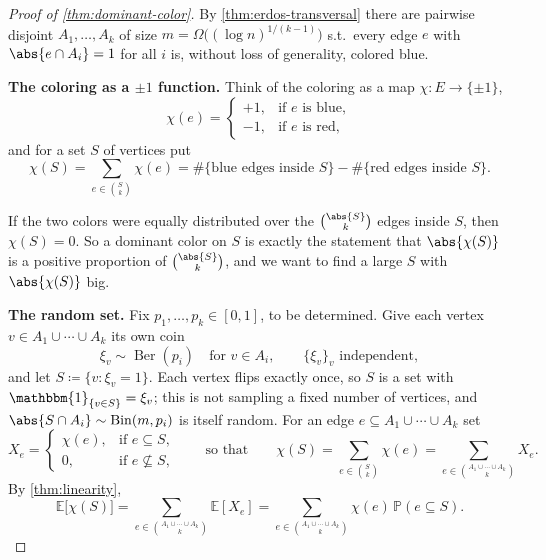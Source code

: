 \begin{proof}[Proof of \autoref{thm:dominant-color}]
    By \autoref{thm:erdos-transversal} there are pairwise disjoint \(A_1, \ldots, A_k\) of size \(m = \Omega\bigl( (\log n)^{1/(k-1)} \bigr)\) s.t.\ every edge \(e\) with \(\abs{e \cap A_i} = 1\) for all \(i\) is, without loss of generality, colored blue.

    \textbf{The coloring as a \(\pm 1\) function.} Think of the coloring as a map \(\chi \colon E \to \{\pm 1\}\),
    \[
        \chi(e) =
        \begin{cases}
            +1, & \text{if } e \text{ is blue}, \\
            -1, & \text{if } e \text{ is red},
        \end{cases}
    \]
    and for a set \(S\) of vertices put
    \[
        \chi(S) = \sum_{e \in \binom{S}{k}} \chi(e) = \#\{\text{blue edges inside } S\} - \#\{\text{red edges inside } S\}.
    \]

    \begin{observation}
        If the two colors were equally distributed over the \(\binom{\abs{S}}{k}\) edges inside \(S\), then \(\chi(S) = 0\). So a dominant color on \(S\) is exactly the statement that \(\abs{\chi(S)}\) is a positive proportion of \(\binom{\abs{S}}{k}\), and we want to find a large \(S\) with \(\abs{\chi(S)}\) big.
    \end{observation}

    \textbf{The random set.} Fix \(p_1, \ldots, p_k \in [0,1]\), to be determined. Give each vertex \(v \in A_1 \cup \cdots \cup A_k\) its own coin
    \[
        \xi_v \sim \operatorname{Ber}(p_i) \quad \text{for } v \in A_i, \qquad \{\xi_v\}_{v} \text{ independent},
    \]
    and let \(S \coloneqq \{ v : \xi_v = 1 \}\). Each vertex flips exactly once, so \(S\) is a set with \(\mathbbm{1}_{\{v \in S\}} = \xi_v\); this is not sampling a fixed number of vertices, and \(\abs{S \cap A_i} \sim \operatorname{Bin}(m, p_i)\) is itself random. For an edge \(e \subseteq A_1 \cup \cdots \cup A_k\) set
    \[
        X_e =
        \begin{cases}
            \chi(e), & \text{if } e \subseteq S, \\
            0, & \text{if } e \not\subseteq S,
        \end{cases}
        \qquad \text{so that} \qquad
        \chi(S) = \sum_{e \in \binom{S}{k}} \chi(e) = \sum_{e \in \binom{A_1 \cup \cdots \cup A_k}{k}} X_e.
    \]
    By \autoref{thm:linearity},
    \[
        \mathbb{E}\bigl[ \chi(S) \bigr]
        = \sum_{e \in \binom{A_1 \cup \cdots \cup A_k}{k}} \mathbb{E}[X_e]
        = \sum_{e \in \binom{A_1 \cup \cdots \cup A_k}{k}} \chi(e) \, \mathbb{P}(e \subseteq S).
    \]


\end{proof}
